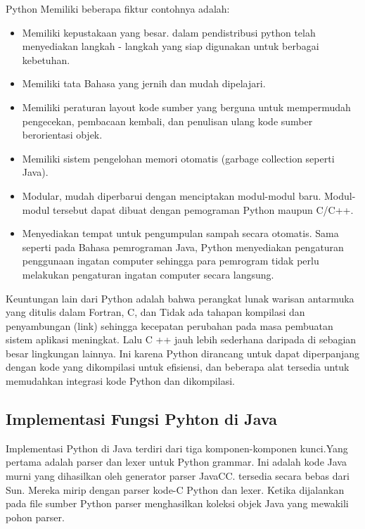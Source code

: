 \documentclass[12pt,a4paper]{article}
\begin{document}
Python Memiliki beberapa fiktur contohnya adalah: 
\begin{itemize}

\item Memiliki kepustakaan yang besar. dalam pendistribusi python telah menyediakan langkah - langkah yang siap digunakan untuk berbagai kebetuhan. 

\item Memiliki tata Bahasa yang jernih dan mudah dipelajari. 

\item Memiliki peraturan layout kode sumber yang berguna untuk mempermudah pengecekan, pembacaan kembali, dan penulisan ulang kode sumber berorientasi objek. 

\item Memiliki sistem pengelohan memori otomatis (garbage collection seperti Java). 

\item Modular, mudah diperbarui dengan menciptakan modul-modul baru. Modul-modul tersebut dapat dibuat dengan pemograman Python maupun C/C++. 

\item Menyediakan tempat untuk pengumpulan sampah secara otomatis. Sama seperti pada Bahasa pemrograman Java, Python menyediakan pengaturan penggunaan ingatan computer sehingga para pemrogram tidak perlu melakukan pengaturan ingatan computer secara langsung.

\end{itemize}
Keuntungan lain dari Python adalah bahwa perangkat lunak warisan antarmuka yang ditulis dalam Fortran, C, dan Tidak ada tahapan kompilasi dan penyambungan (link) sehingga kecepatan perubahan pada masa pembuatan sistem aplikasi meningkat. Lalu C ++ jauh lebih sederhana daripada di sebagian besar lingkungan lainnya. Ini karena Python dirancang untuk dapat diperpanjang dengan kode yang dikompilasi untuk efisiensi, dan beberapa alat tersedia untuk memudahkan integrasi kode Python dan dikompilasi.


\subsection{Implementasi Fungsi Pyhton di Java}

Implementasi Python di Java terdiri dari tiga komponen-komponen kunci.Yang pertama adalah parser dan lexer untuk Python grammar. Ini adalah kode Java murni yang dihasilkan oleh generator parser JavaCC. tersedia secara bebas dari Sun. Mereka mirip dengan parser kode-C Python dan lexer. Ketika dijalankan pada file sumber Python parser menghasilkan koleksi objek Java yang mewakili pohon parser.\\
\end{document}
